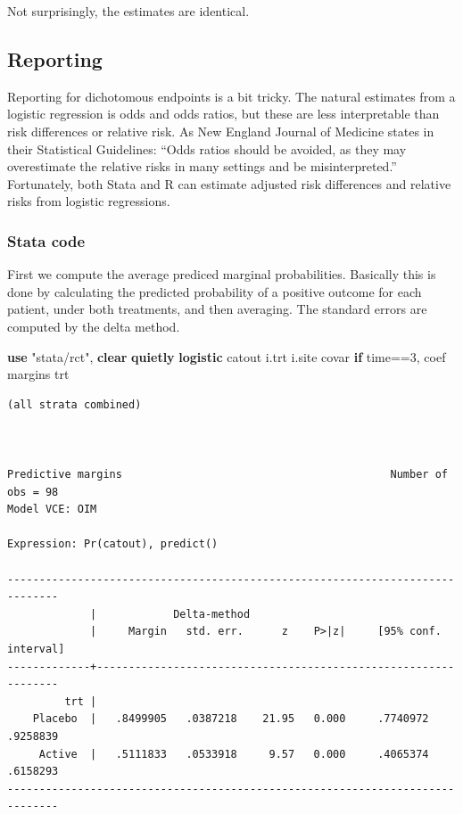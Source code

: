 \documentclass[
]{book}
\newenvironment{Shaded}{\begin{snugshade}}{\end{snugshade}}
\newcommand{\KeywordTok}[1]{\textcolor[rgb]{0.13,0.29,0.53}{\textbf{#1}}}
\newcommand{\NormalTok}[1]{#1}
\newcommand{\StringTok}[1]{\textcolor[rgb]{0.31,0.60,0.02}{#1}}
\begin{document}
Not surprisingly, the estimates are identical.

\subsection{Reporting}\label{reporting-1}

Reporting for dichotomous endpoints is a bit tricky. The natural estimates from a logistic regression is odds and odds ratios, but these are less interpretable than risk differences or relative risk. As New England Journal of Medicine states in their Statistical Guidelines: ``Odds ratios should be avoided, as they may overestimate the relative risks in many settings and be misinterpreted.'' Fortunately, both Stata and R can estimate adjusted risk differences and relative risks from logistic regressions.

\subsubsection{Stata code}\label{stata-code-2}

First we compute the average prediced marginal probabilities. Basically this is done by calculating the predicted probability of a positive outcome for each patient, under both treatments, and then averaging. The standard errors are computed by the delta method.

\begin{Shaded}
\begin{Highlighting}[]
\KeywordTok{use} \StringTok{"stata/rct"}\NormalTok{, }\KeywordTok{clear} 
\KeywordTok{quietly} \KeywordTok{logistic}\NormalTok{ catout i.trt i.site covar  }\KeywordTok{if}\NormalTok{ time==3, coef}
\NormalTok{margins trt}
\end{Highlighting}
\end{Shaded}

\begin{verbatim}
(all strata combined)



Predictive margins                                          Number of obs = 98
Model VCE: OIM

Expression: Pr(catout), predict()

------------------------------------------------------------------------------
             |            Delta-method
             |     Margin   std. err.      z    P>|z|     [95% conf. interval]
-------------+----------------------------------------------------------------
         trt |
    Placebo  |   .8499905   .0387218    21.95   0.000     .7740972    .9258839
     Active  |   .5111833   .0533918     9.57   0.000     .4065374    .6158293
------------------------------------------------------------------------------
\end{verbatim}
\end{document}
